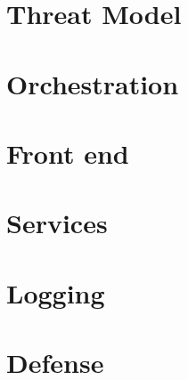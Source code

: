 \documentclass[letterpaper,twocolumn,10pt]{article}
\begin{document}
\section{Threat Model}


\section{Orchestration}


\section{Front end}


\section{Services}


\section{Logging}


\section{Defense}





\end{document}
